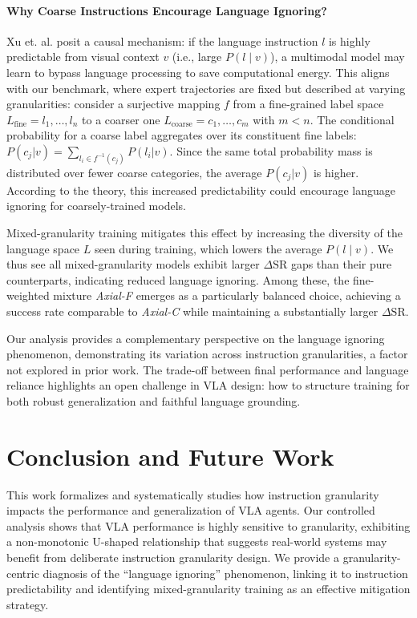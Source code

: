 \documentclass{article}
\begin{document}
\paragraph{Why Coarse Instructions Encourage Language Ignoring?}
Xu et. al.  posit a causal mechanism: if the language instruction $l$ is highly predictable from visual context $v$ (i.e., large $P(l \mid v)$), a multimodal model may learn to bypass language processing to save computational energy. This aligns with our benchmark, where expert trajectories are fixed but described at varying granularities: consider a surjective mapping $f$ from a fine-grained label space $L_{\text{fine}} = {l_1, \dots, l_n}$ to a coarser one $L_{\text{coarse}} = {c_1, \dots, c_m}$ with $m < n$. The conditional probability for a coarse label aggregates over its constituent fine labels: $P(c_j | v) = \sum_{l_i \in f^{-1}(c_j)} P(l_i | v)$. Since the same total probability mass is distributed over fewer coarse categories, the average $P(c_j | v)$ is higher. According to the theory, this increased predictability could encourage language ignoring for coarsely-trained models.

Mixed-granularity training mitigates this effect by increasing the diversity of the language space $L$ seen during training, which lowers the average $P(l \mid v)$. We thus see all mixed-granularity models exhibit larger $\Delta\mathrm{SR}$ gaps than their pure counterparts, indicating reduced language ignoring. Among these, the fine-weighted mixture \emph{Axial-F} emerges as a particularly balanced choice, achieving a success rate comparable to \emph{Axial-C} while maintaining a substantially larger $\Delta\mathrm{SR}$. 

Our analysis provides a complementary perspective on the language ignoring phenomenon, demonstrating its variation across instruction granularities, a factor not explored in prior work. The trade-off between final performance and language reliance highlights an open challenge in VLA design: how to structure training for both robust generalization and faithful language grounding.

\section{Conclusion and Future Work}
\label{sec:conclusion}
This work formalizes and systematically studies how instruction granularity impacts the performance and generalization of VLA agents. Our controlled analysis shows that VLA performance is highly sensitive to granularity, exhibiting a non-monotonic U-shaped relationship that suggests real-world systems may benefit from deliberate instruction granularity design. We provide a granularity-centric diagnosis of the ``language ignoring'' phenomenon, linking it to instruction predictability and identifying mixed-granularity training as an effective mitigation strategy.
\end{document}
